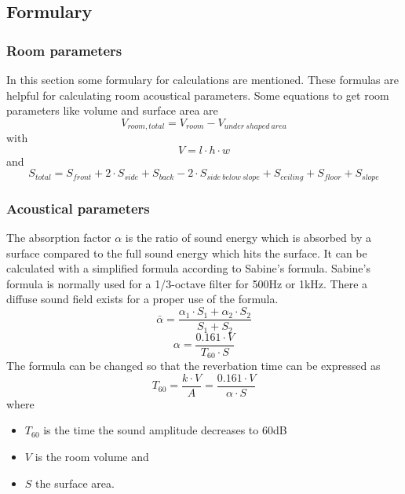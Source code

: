 \documentclass{article}
\begin{document}
\subsection{Formulary}
\subsubsection{Room parameters}
In this section some formulary for calculations are mentioned. These formulas are helpful for calculating room acoustical parameters.
Some equations to get room parameters like volume and surface area are
\begin{equation}
V_{room,total}=V_{room}-V_{under\ shaped\ area}
\end{equation}
with
\begin{equation}
V=l\cdot h\cdot w
\end{equation}
and
\begin{equation}
S_{total}=S_{front}+2\cdot S_{side}+S_{back}-2\cdot S_{side\ below\ slope}+S_{ceiling}+S_{floor}+S_{slope}
\end{equation}
\subsubsection{Acoustical parameters}
The absorption factor $\alpha$ is the ratio of sound energy which is absorbed by a surface compared to the full sound energy which hits the surface. It can be calculated with a simplified formula according to Sabine's formula. Sabine's formula is normally used for a 1/3-octave filter for 500Hz or 1kHz. There a diffuse sound field exists for a proper use of the formula.
\begin{equation}
\bar{\alpha}=\frac{\alpha_1\cdot S_1+\alpha_2\cdot S_2}{S_1+S_2}
\end{equation}
\begin{equation}
\alpha=\frac{0.161\cdot V}{T_{60}\cdot S}
\end{equation}
The formula can be changed so that the reverbation time can be expressed as
\begin{equation}
T_{60}=\frac{k\cdot V}{A}=\frac{0.161\cdot V}{\alpha\cdot S}
\end{equation}
where 
\begin{itemize}
\item $T_{60}$ is the time the sound amplitude decreases to 60dB
\item $V$ is the room volume and
\item $S$ the surface area.
\end{itemize}
\end{document}
